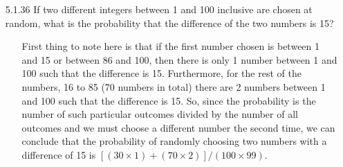 \documentclass[12pt]{article}
\begin{document}
\begin{enumerate}
\item[5.1.36] If two different integers between 1 and 100 inclusive are chosen at random, what is the probability that the difference of the two numbers is 15?
\begin{enumerate}
\item[] First thing to note here is that if the first number chosen is between 1 and 15 or between 86
and 100, then there is only 1 number between 1 and 100 such that the difference is 15. Furthermore,
for the rest of the numbers, 16 to 85 (70 numbers in total) there are 2 numbers between 1 and 100 such
that the difference is 15. So, since the probability is the number of such particular 
outcomes divided by the number of all outcomes and we must choose a different number the second time,
we can conclude that the probability of randomly choosing two numbers with a difference of 15 is 
$[(30 \times 1) + (70 \times 2)]/(100 \times 99)$.
\end{enumerate}


\end{enumerate}
\end{document}
